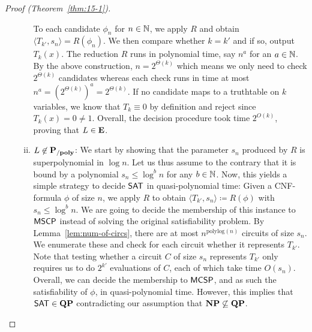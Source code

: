\documentclass[11pt]{article}
\begin{document}
\begin{proof}[Proof (Theorem~\ref{thm:15-1})]
\begin{itemize}
\begin{enumerate}[(i)]
          To each candidate $\phi_n$ for $n \in {\mathbb{N}}$, we apply $R$ and obtain
          $\langle T_{k'}, s_n \rangle = R(\phi_n)$.
          We then compare whether $k = k'$ and if so, output $T_k(x)$.
          The reduction $R$ runs in polynomial time, say $n^a$ for an
          $a \in {\mathbb{N}}$.
          By the above construction, $n = 2^{\Theta(k)}$ which means we
          only need to check $2^{\Theta(k)}$ candidates whereas each check
          runs in time at most $n^a = (2^{\Theta(k)})^a = 2^{\Theta(k)}$.
          If no candidate maps to a truthtable on $k$ variables, we know
          that $T_k \equiv 0$ by definition and reject since
          $T_k(x) = 0 \not= 1$.
          Overall, the decision procedure took time $2^{O(k)}$, proving
          that $L \in \mathbf{E}$.

        \item $L \not\in \mathbf{P_{/poly}}$:
          We start by showing that the parameter $s_n$ produced by $R$ is
          superpolynomial in $\log n$.
          Let us thus assume to the contrary that it is bound by a polynomial
          $s_n \le \log^b n$ for any $b \in {\mathbb{N}}$.
          Now, this yields a simple strategy to decide $\mathsf{SAT}$ in
          quasi-polynomial time:
          Given a CNF-formula $\phi$ of size $n$, we apply
          $R$ to obtain $\langle T_{k'}, s_n \rangle \coloneqq R(\phi)$
          with $s_n \le \log^b n$.
          We are going to decide the membership of this instance to
          $\mathsf{MSCP}$ instead of solving
          the original satisfiability problem.
          By Lemma~\ref{lem:num-of-circs}, there are at most
          $n^{\mathrm{polylog}(n)}$ circuits of size $s_n$.
          We enumerate these and check for each circuit whether
          it represents $T_{k'}$.
          Note that testing whether a circuit $C$ of size $s_n$ represents
          $T_{k'}$ only requires us to do $2^{k'}$ evaluations of $C$, each of
          which take time $O(s_n)$.
          Overall, we can decide the membership to $\mathsf{MCSP}$, and
          as such the satisfiability of $\phi$, in quasi-polynomial time.
          However, this implies that $\mathsf{SAT} \in \mathbf{QP}$
          contradicting our assumption that $\mathbf{NP} \not\subseteq \mathbf{QP}$.


\end{enumerate}
\end{itemize}
\end{proof}
\end{document}
